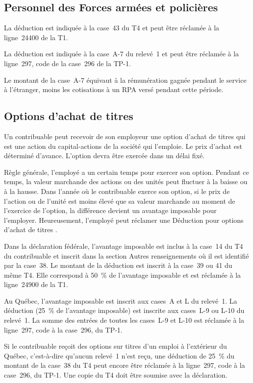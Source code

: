 \subsection{Personnel des Forces armées et policières}
La déduction est indiquée à la case~43 du T4 et peut être réclamée à la ligne~24400 de la T1.

La déduction est indiquée à la case~A-7 du relevé~1 et peut être réclamée à la ligne~297, code  \fg{} de la case~296 de la TP-1.

Le montant de la case~A-7 équivaut à la rémunération gagnée pendant le service à l'étranger, moins les cotisations à un RPA versé pendant cette période.


\subsection{Options d'achat de titres}
Un contribuable peut recevoir de son employeur une option d'achat de titres qui est une action du capital-actions de la société qui l'emploie. Le prix d'achat est déterminé d'avance. L'option devra être exercée dans un délai fixé.

Règle générale, l'employé a un certain temps pour exercer son option. Pendant ce temps, la valeur marchande des actions ou des unités peut fluctuer à la baisse ou à la hausse. Dans l'année où le contribuable exerce son option, si le prix de l'action ou de l'unité est moins élevé que sa valeur marchande au moment de l'exercice de l'option, la différence devient un avantage imposable pour l'employer. Heureusement, l'employé peut réclamer une \og Déduction pour options d'achat de titres \fg{}.

Dans la déclaration fédérale, l'avantage imposable est inclus à la case~14 du T4 du contribuable et inscrit dans la section \og Autres renseignements \fg{} où il est identifié par la case~38. Le montant de la déduction est inscrit à la case~39 ou 41 du même T4. Elle correspond à 50~\% de l'avantage imposable et est réclamée à la ligne~24900 de la T1.

Au Québec, l'avantage imposable est inscrit aux cases~A et L du relevé~1. La déduction (25~\% de l'avantage imposable) est inscrite aux cases~L-9 ou L-10 du relevé~1. La somme des entrées de toutes les cases~L-9 et L-10 est réclamée à la ligne~297, code  \fg{} à la case~296, du TP-1.

Si le contribuable reçoit des options sur titres d'un emploi à l'extérieur du Québec, c'est-à-dire qu'aucun relevé~1 n'est reçu, une déduction de 25~\% du montant de la case~38 du T4 peut encore être réclamée à la ligne~297, code  \fg{} à la case~296, du TP-1. Une copie du T4 doit être soumise avec la déclaration.


